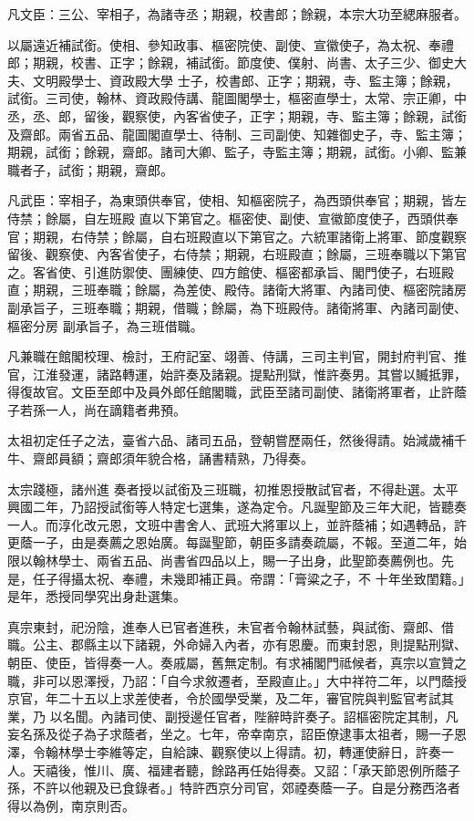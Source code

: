 \begin{pinyinscope}
 凡文臣：三公、宰相子，為諸寺丞；期親，校書郎；餘親，本宗大功至緦麻服者。



 以屬遠近補試銜。使相、參知政事、樞密院使、副使、宣徽使子，為太祝、奉禮郎；期親，校書、正字；餘親，補試銜。節度使、僕射、尚書、太子三少、御史大夫、文明殿學士、資政殿大學
 士子，校書郎、正字；期親，寺、監主簿；餘親，試銜。三司使，翰林、資政殿侍講、龍圖閣學士，樞密直學士，太常、宗正卿，中丞，丞、郎，留後，觀察使，內客省使子，正字；期親，寺、監主簿；餘親，試銜及齋郎。兩省五品、龍圖閣直學士、待制、三司副使、知雜御史子，寺、監主簿；期親，試銜；餘親，齋郎。諸司大卿、監子，寺監主簿；期親，試銜。小卿、監兼職者子，試銜；期親，齋郎。



 凡武臣：宰相子，為東頭供奉官，使相、知樞密院子，為西頭供奉官；期親，皆左侍禁；餘屬，自左班殿
 直以下第官之。樞密使、副使、宣徽節度使子，西頭供奉官；期親，右侍禁；餘屬，自右班殿直以下第官之。六統軍諸衛上將軍、節度觀察留後、觀察使、內客省使子，右侍禁；期親，右班殿直；餘屬，三班奉職以下第官之。客省使、引進防禦使、團練使、四方館使、樞密都承旨、閣門使子，右班殿直；期親，三班奉職；餘屬，為差使、殿侍。諸衛大將軍、內諸司使、樞密院諸房副承旨子，三班奉職；期親，借職；餘屬，為下班殿侍。諸衛將軍、內諸司副使、樞密分房
 副承旨子，為三班借職。



 凡兼職在館閣校理、檢討，王府記室、翊善、侍講，三司主判官，開封府判官、推官，江淮發運，諸路轉運，始許奏及諸親。提點刑獄，惟許奏男。其嘗以贓抵罪，得復故官。文臣至郎中及員外郎任館閣職，武臣至諸司副使、諸衛將軍者，止許蔭子若孫一人，尚在謫籍者弗預。



 太祖初定任子之法，臺省六品、諸司五品，登朝嘗歷兩任，然後得請。始減歲補千牛、齋郎員額；齋郎須年貌合格，誦書精熟，乃得奏。



 太宗踐極，諸州進
 奏者授以試銜及三班職，初推恩授散試官者，不得赴選。太平興國二年，乃詔授試銜等人特定七選集，遂為定令。凡誕聖節及三年大祀，皆聽奏一人。而淳化改元恩，文班中書舍人、武班大將軍以上，並許蔭補；如遇轉品，許更蔭一子，由是奏薦之恩始廣。每誕聖節，朝臣多請奏疏屬，不報。至道二年，始限以翰林學士、兩省五品、尚書省四品以上，賜一子出身，此聖節奏薦例也。先是，任子得攝太祝、奉禮，未幾即補正員。帝謂：「膏粱之子，不
 十年坐致閨籍。」是年，悉授同學究出身赴選集。



 真宗東封，祀汾陰，進奉人已官者進秩，未官者令翰林試藝，與試銜、齋郎、借職。公主、郡縣主以下諸親，外命婦入內者，亦有恩慶。而東封恩，則提點刑獄、朝臣、使臣，皆得奏一人。奏戚屬，舊無定制。有求補閣門祗候者，真宗以宣贊之職，非可以恩澤授，乃詔：「自今求敘遷者，至殿直止。」大中祥符二年，以門蔭授京官，年二十五以上求差使者，令於國學受業，及二年，審官院與判監官考試其業，乃
 以名聞。內諸司使、副授邊任官者，陛辭時許奏子。詔樞密院定其制，凡妄名孫及從子為子求蔭者，坐之。七年，帝幸南京，詔臣僚逮事太祖者，賜一子恩澤，令翰林學士李維等定，自給諫、觀察使以上得請。初，轉運使辭日，許奏一人。天禧後，惟川、廣、福建者聽，餘路再任始得奏。又詔：「承天節恩例所蔭子孫，不許以他親及已食錄者。」特許西京分司官，郊禋奏蔭一子。自是分務西洛者得以為例，南京則否。




\end{pinyinscope}
